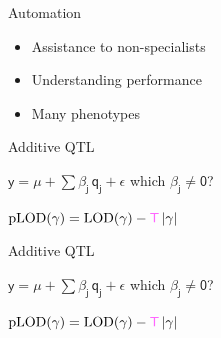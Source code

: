 \documentclass[12pt]{article}
\newcommand{\headsize}{\fontsize{35}{35} \selectfont}
\newcommand{\smallersize}{\fontsize{20}{25} \selectfont}
\newcommand{\lod}{\text{LOD}}
\newcommand{\plod}{\text{pLOD}}
\begin{document}
\newpage

\headsize \color{myyellow}
\hfill \begin{minipage}{5.75in}
\centering
Automation
\end{minipage}

\vspace{3cm} \color{mywhite} \smallersize

\hfill \begin{minipage}{10in}
\begin{itemize}
\itemsep24pt

\item Assistance to non-specialists

\item Understanding performance

\item Many phenotypes

\end{itemize}
\end{minipage}


\newpage


\headsize \color{myyellow}
\hfill \begin{minipage}{5.75in}
\centering
Additive QTL
\end{minipage}

\vspace{6cm}

\color{mywhite} \smallersize
\hfill \begin{minipage}{10in}

\centerline{
$\mathsf{y  = \mu + \sum \beta_j \, q_j + \epsilon}$ \hspace{1cm}
       {\color{mypink} which $\mathsf{\beta_j \ne 0}$?}
}

\vspace{3cm}

{\color{myyellow}
$\mathsf{ \plod(\gamma) = \lod(\gamma) -
    {\color{mypink} T} \, |\gamma| }$
}


\end{minipage}

\newpage


\headsize \color{myyellow}
\hfill \begin{minipage}{5.75in}
\centering
Additive QTL
\end{minipage}

\vspace{6cm}

\color{mywhite} \smallersize
\hfill \begin{minipage}{10in}

\centerline{
$\mathsf{y  = \mu + \sum \beta_j \, q_j + \epsilon}$ \hspace{1cm}
       {\color{mypink} which $\mathsf{\beta_j \ne 0}$?}
}

\vspace{3cm}

{\color{myyellow}
$\mathsf{ \plod(\gamma) = \lod(\gamma) -
    {\color{mypink} T} \, |\gamma| }$
}


\end{minipage}
\end{document}
